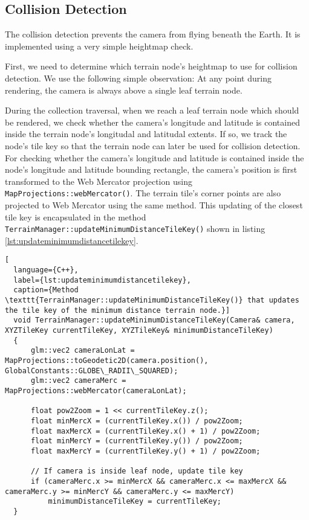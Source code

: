 \subsection{Collision Detection}
The collision detection prevents the camera from 
flying beneath the Earth.
It is implemented using a very simple heightmap check.

First, we need to determine which terrain node's heightmap to use 
for collision detection. We use the following simple observation:
At any point during rendering, the camera is always above 
a single leaf terrain node.

During the collection traversal, when we reach a 
leaf terrain node which should be rendered,
we check whether the camera's longitude and latitude 
is contained inside the terrain node's longitudal 
and latitudal extents. If so, we track the node's tile key 
so that the terrain node can later be used for collision detection.
For checking whether the camera's longitude and latitude 
is contained inside the node's longitude and latitude bounding rectangle,
the camera's position is first transformed to the Web Mercator projection
using \texttt{MapProjections::webMercator()}. The terrain tile's 
corner points are also projected to Web Mercator using the same method.
This updating of the closest tile key is encapsulated in 
the method \texttt{TerrainManager::updateMinimumDistanceTileKey()} 
shown in listing \ref{lst:updateminimumdistancetilekey}.

\begin{lstlisting}[
  language={C++},
  label={lst:updateminimumdistancetilekey},
  caption={Method \texttt{TerrainManager::updateMinimumDistanceTileKey()} that updates the tile key of the minimum distance terrain node.}]
  void TerrainManager::updateMinimumDistanceTileKey(Camera& camera, XYZTileKey currentTileKey, XYZTileKey& minimumDistanceTileKey)
  {
      glm::vec2 cameraLonLat = MapProjections::toGeodetic2D(camera.position(), GlobalConstants::GLOBE\_RADII\_SQUARED);
      glm::vec2 cameraMerc = MapProjections::webMercator(cameraLonLat);
  
      float pow2Zoom = 1 << currentTileKey.z();
      float minMercX = (currentTileKey.x()) / pow2Zoom;
      float maxMercX = (currentTileKey.x() + 1) / pow2Zoom;
      float minMercY = (currentTileKey.y()) / pow2Zoom;
      float maxMercY = (currentTileKey.y() + 1) / pow2Zoom;
  
      // If camera is inside leaf node, update tile key
      if (cameraMerc.x >= minMercX && cameraMerc.x <= maxMercX && cameraMerc.y >= minMercY && cameraMerc.y <= maxMercY)
          minimumDistanceTileKey = currentTileKey;
  }
\end{lstlisting}

